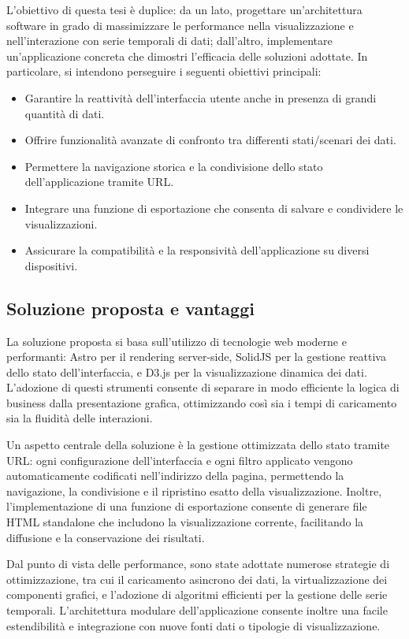 L’obiettivo di questa tesi è duplice: da un lato, progettare un’architettura software in grado di massimizzare le performance nella visualizzazione e nell’interazione con serie temporali di dati; dall’altro, implementare un’applicazione concreta che dimostri l’efficacia delle soluzioni adottate. In particolare, si intendono perseguire i seguenti obiettivi principali:
\begin{itemize}
    \item Garantire la reattività dell’interfaccia utente anche in presenza di grandi quantità di dati.
    \item Offrire funzionalità avanzate di confronto tra differenti stati/scenari dei dati.
    \item Permettere la navigazione storica e la condivisione dello stato dell’applicazione tramite URL.
    \item Integrare una funzione di esportazione che consenta di salvare e condividere le visualizzazioni.
    \item Assicurare la compatibilità e la responsività dell’applicazione su diversi dispositivi.
\end{itemize}

\subsection{Soluzione proposta e vantaggi}

La soluzione proposta si basa sull’utilizzo di tecnologie web moderne e performanti: Astro per il rendering server-side, SolidJS per la gestione reattiva dello stato dell’interfaccia, e D3.js per la visualizzazione dinamica dei dati. L’adozione di questi strumenti consente di separare in modo efficiente la logica di business dalla presentazione grafica, ottimizzando così sia i tempi di caricamento sia la fluidità delle interazioni.

Un aspetto centrale della soluzione è la gestione ottimizzata dello stato tramite URL: ogni configurazione dell’interfaccia e ogni filtro applicato vengono automaticamente codificati nell’indirizzo della pagina, permettendo la navigazione, la condivisione e il ripristino esatto della visualizzazione. Inoltre, l’implementazione di una funzione di esportazione consente di generare file HTML standalone che includono la visualizzazione corrente, facilitando la diffusione e la conservazione dei risultati.

Dal punto di vista delle performance, sono state adottate numerose strategie di ottimizzazione, tra cui il caricamento asincrono dei dati, la virtualizzazione dei componenti grafici, e l’adozione di algoritmi efficienti per la gestione delle serie temporali. L’architettura modulare dell’applicazione consente inoltre una facile estendibilità e integrazione con nuove fonti dati o tipologie di visualizzazione.

